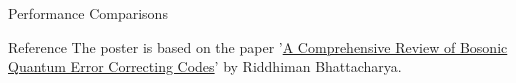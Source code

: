 \documentclass[8pt,final,hyperref={pdfpagelabels=false}]{beamer}
\theoremstyle{plain}
\newcommand\0{\mathbf{0}}
\begin{document}
\begin{frame}
\begin{columns}[t]
\begin{column}{.23\textwidth}
\begin{block}{Performance Comparisons}
    \end{block}
    \begin{block}{Reference}
        The poster is based on the paper '\href{https://vixra.org/abs/2404.0090}{A Comprehensive Review of Bosonic Quantum Error Correcting Codes}' by
Riddhiman Bhattacharya. 
        \nocite{*} %
    
    \end{block}

\end{column} 
\end{columns}
\end{frame}
\end{document}

